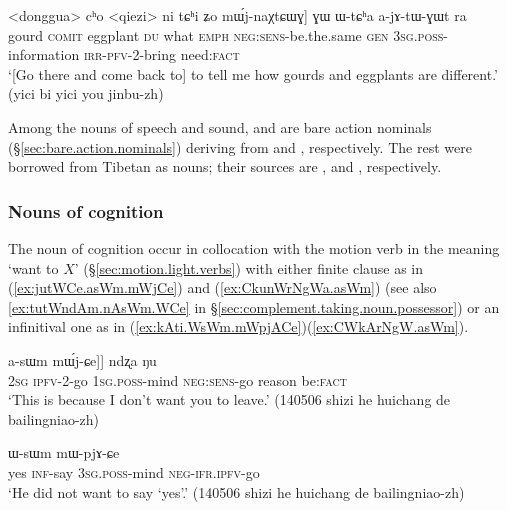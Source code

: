 \begin{exe}
\ex  \label{ex:WtCha.ajAtWGWt}
\gll <donggua> cʰo <qiezi> ni tɕʰi ʑo mɯ́j-naχtɕɯɣ] ɣɯ ɯ-tɕʰa a-jɤ-tɯ-ɣɯt ra \\
gourd \textsc{comit} eggplant \textsc{du} what \textsc{emph} \textsc{neg}:\textsc{sens}-be.the.same \textsc{gen} \textsc{3sg}.\textsc{poss}-information \textsc{irr}-\textsc{pfv}-2-bring need:\textsc{fact} \\
\glt `[Go there and come back to] to tell me how gourds and eggplants are different.' (yici bi yici you jinbu-zh)
\end{exe}

Among the nouns of speech and sound,   and  are bare action nominals (§\ref{sec:bare.action.nominals}) deriving from  and , respectively. The rest were borrowed from Tibetan as nouns; their sources are ,  and , respectively.

\subsubsection{Nouns of cognition} \label{sec:nouns.cognition.complement}
The noun of cognition  occur in collocation with the motion verb  in the meaning `want to $X$' (§\ref{sec:motion.light.verbs}) with either finite clause as in (\ref{ex:jutWCe.asWm.mWjCe}) and (\ref{ex:CkunWrNgWa.asWm}) (see also \ref{ex:tutWndAm.nAsWm.WCe} in §\ref{sec:complement.taking.noun.possessor}) or an infinitival one as in (\ref{ex:kAti.WsWm.mWpjACe})(\ref{ex:CWkArNgW.asWm}).


\begin{exe}
\ex  \label{ex:jutWCe.asWm.mWjCe}
\gll [[nɤʑo ju-tɯ-ɕe] a-sɯm mɯ́j-ɕe]] ndʐa ŋu \\
\textsc{2sg} \textsc{ipfv}-2-go \textsc{1sg}.\textsc{poss}-mind \textsc{neg}:\textsc{sens}-go reason be:\textsc{fact} \\
\glt `This is because I don't want you to leave.' (140506 shizi he huichang de bailingniao-zh)
\end{exe}

\begin{exe}
\ex  \label{ex:kAti.WsWm.mWpjACe}
\gll [``ɣa" kɤ-ti] ɯ-sɯm mɯ-pjɤ-ɕe \\
yes \textsc{inf}-say \textsc{3sg}.\textsc{poss}-mind \textsc{neg}-\textsc{ifr}.\textsc{ipfv}-go \\
\glt `He did not want to say `yes'.' (140506 shizi he huichang de bailingniao-zh)
\end{exe}


